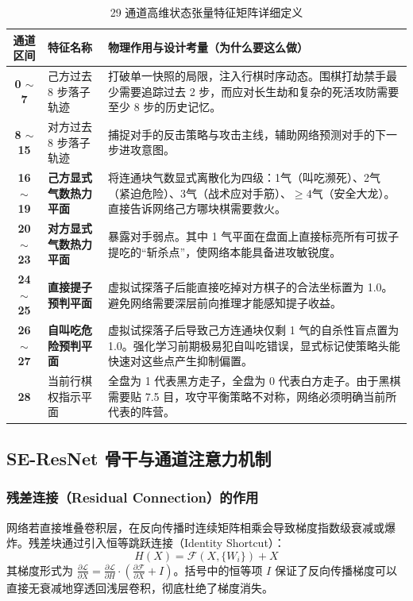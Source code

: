 \documentclass[11pt,a4paper]{ctexart}
\begin{document}
\begin{table}[H]
\centering
\caption{29 通道高维状态张量特征矩阵详细定义}
\label{tab:features}
\small
\begin{tabular}{clp{7.5cm}}
\toprule
\textbf{通道区间} & \textbf{特征名称} & \textbf{物理作用与设计考量（为什么要这么做）} \\
\midrule
\textbf{0 $\sim$ 7} & 己方过去 8 步落子轨迹 & 打破单一快照的局限，注入行棋时序动态。围棋打劫禁手最少需要追踪过去 2 步，而应对长生劫和复杂的死活攻防需要至少 8 步的历史记忆。 \\
\textbf{8 $\sim$ 15} & 对方过去 8 步落子轨迹 & 捕捉对手的反击策略与攻击主线，辅助网络预测对手的下一步进攻意图。 \\
\textbf{16 $\sim$ 19} & \textbf{己方显式气数热力平面} & 将连通块气数显式离散化为四级：1气（叫吃濒死）、2气（紧迫危险）、3气（战术应对手筋）、$\ge 4$气（安全大龙）。直接告诉网络己方哪块棋需要救火。 \\
\textbf{20 $\sim$ 23} & \textbf{对方显式气数热力平面} & 暴露对手弱点。其中 1 气平面在盘面上直接标亮所有可拔子提吃的“斩杀点”，使网络本能具备进攻敏锐度。 \\
\textbf{24 $\sim$ 25} & \textbf{直接提子预判平面} & 虚拟试探落子后能直接吃掉对方棋子的合法坐标置为 1.0。避免网络需要深层前向推理才能感知提子收益。 \\
\textbf{26 $\sim$ 27} & \textbf{自叫吃危险预判平面} & 虚拟试探落子后导致己方连通块仅剩 1 气的自杀性盲点置为 1.0。强化学习前期极易犯自叫吃错误，显式标记使策略头能快速对这些点产生抑制偏置。 \\
\textbf{28} & 当前行棋权指示平面 & 全盘为 1 代表黑方走子，全盘为 0 代表白方走子。由于黑棋需要贴 7.5 目，攻守平衡策略不对称，网络必须明确当前所代表的阵营。 \\
\bottomrule
\end{tabular}
\end{table}

\subsection{SE-ResNet 骨干与通道注意力机制}

\subsubsection{残差连接（Residual Connection）的作用}
网络若直接堆叠卷积层，在反向传播时连续矩阵相乘会导致梯度指数级衰减或爆炸。残差块通过引入恒等跳跃连接（Identity Shortcut）：
\begin{equation}
H(X) = \mathcal{F}(X, \{W_i\}) + X
\end{equation}
其梯度形式为 $\frac{\partial \mathcal{L}}{\partial X} = \frac{\partial \mathcal{L}}{\partial H} \cdot \left(\frac{\partial \mathcal{F}}{\partial X} + I\right)$。括号中的恒等项 $I$ 保证了反向传播梯度可以直接无衰减地穿透回浅层卷积，彻底杜绝了梯度消失。
\end{document}
